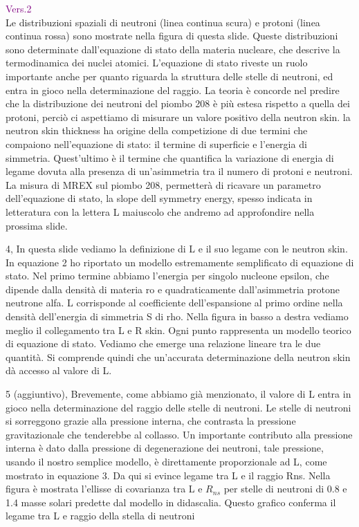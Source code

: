 \documentclass[11pt,a4paper]{article}
\begin{document}
\begin{list}{\textbf{slide}}{}
\textcolor{purple}{Vers.2} \\
Le distribuzioni spaziali di neutroni (linea continua scura) e protoni (linea continua rossa) sono mostrate nella figura di questa slide. Queste distribuzioni sono determinate dall'equazione di stato della materia nucleare, che descrive la termodinamica dei nuclei atomici. L'equazione di stato riveste un ruolo importante anche per quanto riguarda la struttura delle stelle di neutroni, ed entra in gioco nella determinazione del raggio. La teoria è concorde nel predire che la distribuzione dei neutroni del piombo 208 è più estesa rispetto a quella dei protoni, perciò ci aspettiamo di misurare un valore positivo della neutron skin. la neutron skin thickness ha origine della competizione di due termini che compaiono nell'equazione di stato: il termine di superficie e l'energia di simmetria. Quest'ultimo è il termine che quantifica la variazione di energia di legame dovuta alla presenza di un'asimmetria tra il numero di protoni e neutroni. La misura di MREX sul piombo 208, permetterà di ricavare un parametro dell'equazione di stato, la slope dell symmetry energy, spesso indicata in letteratura con la lettera L maiuscolo che andremo ad approfondire nella prossima slide.
	
\item 4, In questa slide vediamo la definizione di L e il suo legame con le neutron skin. In equazione 2 ho riportato un modello estremamente semplificato di equazione di stato. Nel primo termine abbiamo l'energia per singolo nucleone epsilon, che dipende dalla densità di materia ro e quadraticamente dall'asimmetria protone neutrone alfa. L corrisponde al coefficiente dell'espansione al primo ordine nella densità dell'energia di simmetria S di rho. Nella figura in basso a destra vediamo meglio il collegamento tra L e R skin. Ogni punto rappresenta un modello teorico di equazione di stato. Vediamo che emerge una relazione lineare tra le due quantità. Si comprende quindi che un'accurata determinazione della neutron skin dà accesso al valore di L.

\item 5 (aggiuntivo), Brevemente, come abbiamo già menzionato, il valore di L entra in gioco nella determinazione del raggio delle stelle di neutroni. Le stelle di neutroni si sorreggono grazie alla pressione interna, che contrasta la pressione gravitazionale che tenderebbe al collasso. Un importante contributo alla pressione interna è dato dalla pressione di degenerazione dei neutroni, tale pressione, usando il nostro semplice modello, è direttamente proporzionale ad L, come mostrato in equazione 3. Da qui si evince legame tra L e il raggio Rns. Nella figura è mostrata l'ellisse di covarianza tra L e $R_{ns}$ per stelle di neutroni di 0.8 e 1.4 masse solari predette dal modello in didascalia. Questo grafico conferma il legame tra L e raggio della stella di neutroni


\end{list}
\end{document}

